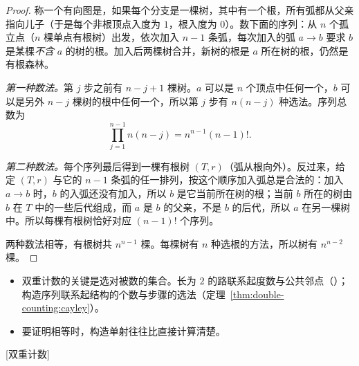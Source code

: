 \begin{proof}
称一个有向图是，如果每个分支是一棵树，其中有一个根，所有弧都从父亲指向儿子（于是每个非根顶点入度为 $1$，根入度为 $0$）。数下面的序列：从 $n$ 个孤立点（$n$ 棵单点有根树）出发，依次加入 $n-1$ 条弧，每次加入的弧 $a\to b$ 要求 $b$ 是某棵\emph{不含} $a$ 的树的根。加入后两棵树合并，新树的根是 $a$ 所在树的根，仍然是有根森林。

\emph{第一种数法。}第 $j$ 步之前有 $n-j+1$ 棵树。$a$ 可以是 $n$ 个顶点中任何一个，$b$ 可以是另外 $n-j$ 棵树的根中任何一个，所以第 $j$ 步有 $n(n-j)$ 种选法。序列总数为
\[
\prod_{j=1}^{n-1}n(n-j)=n^{n-1}(n-1)! .
\]

\emph{第二种数法。}每个序列最后得到一棵有根树 $(T,r)$（弧从根向外）。反过来，给定 $(T,r)$ 与它的 $n-1$ 条弧的任一排列，按这个顺序加入弧总是合法的：加入 $a\to b$ 时，$b$ 的入弧还没有加入，所以 $b$ 是它当前所在树的根；当前 $b$ 所在的树由 $b$ 在 $T$ 中的一些后代组成，而 $a$ 是 $b$ 的父亲，不是 $b$ 的后代，所以 $a$ 在另一棵树中。所以每棵有根树恰好对应 $(n-1)!$ 个序列。

两种数法相等，有根树共 $n^{n-1}$ 棵。每棵树有 $n$ 种选根的方法，所以树有 $n^{n-2}$ 棵。
\end{proof}


\begin{itemize}
\item 双重计数的关键是选对被数的集合。长为 $2$ 的路联系起度数与公共邻点（）；构造序列联系起结构的个数与步骤的选法（定理~\ref{thm:double-counting:cayley}）。
\item 要证明相等时，构造单射往往比直接计算清楚。
\end{itemize}

[双重计数]


